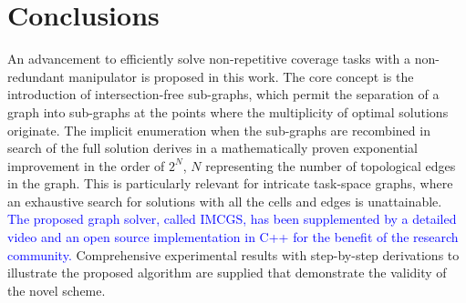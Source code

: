 \documentclass[journal]{IEEEtran}
\begin{document}
\section{Conclusions}
An advancement to efficiently solve non-repetitive coverage tasks with a non-redundant manipulator is proposed in this work. 
The core concept is the introduction of intersection-free sub-graphs, which permit the separation of a graph 
into sub-graphs at the points where the multiplicity of optimal solutions originate. 
The implicit enumeration when the sub-graphs are recombined in search of the full solution derives in a mathematically proven exponential improvement in the order of $2^N$, $N$ representing the number of topological edges in the graph. 
This is particularly relevant for intricate task-space graphs, where an exhaustive search for solutions with all the cells and edges is unattainable. 
\textcolor{blue}{The proposed graph solver, called IMCGS, has been supplemented by a detailed video and an open source implementation in C++ for the benefit of the research community.}
Comprehensive experimental results with step-by-step derivations to illustrate the proposed algorithm are supplied that demonstrate the validity of the novel scheme. 
\label{section_conclusion}



\end{document}
